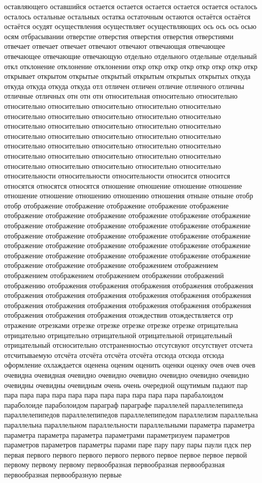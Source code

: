 оставляющего оставшийся остается остается остается остается остается осталось осталось остальные остальных остатка остаточным остаются остаётся остаётся остаётся осудят осуществления осуществляет осуществляющих ось ось ось осью осям отбрасывании отверстие отверстия отверстия отверстия отверстиями отвечает отвечает отвечает отвечают отвечают отвечающая отвечающее отвечающее отвечающие отвечающую отдельно отдельного отдельные отдельный откл отклонение отклонение отклонении откр откр откр откр откр откр откр откр открывает открытом открытые открытый открытым открытых открытых откуда откуда откуда откуда откуда отл отличен отличен отличие отличного отличны отличные отличных отн отн отн относительная относительно относительно относительно относительно относительно относительно относительно относительно относительно относительно относительно относительно относительно относительно относительно относительно относительно относительно относительно относительно относительно относительно относительно относительно относительно относительно относительно относительно относительно относительно относительно относительно относительно относительно относительно относительно относительно относительности относительности относительности относится относится относятся относятся относятся отношение отношение отношение отношение отношение отношение отношению отношению отношения отныне отныне отобр отобр отображение отображение отображение отображение отображение отображение отображение отображение отображение отображение отображение отображение отображение отображение отображение отображение отображение отображение отображение отображение отображение отображение отображение отображение отображение отображение отображение отображение отображение отображение отображение отображение отображение отображение отображение отображение отображение отображение отображением отображением отображением отображением отображением отображении отображений отображению отображения отображения отображения отображения отображения отображения отображения отображения отображения отображения отображения отображения отображения отображения отображения отображения отображения отображения отображения отображения отождествив отождествляется отр отражение отрезками отрезке отрезке отрезке отрезке отрезке отрицательна отрицательно отрицательно отрицательной отрицательной отрицательный отрицательный отсносительно отстраненностью отсутсвуют отсутствует отсчета отсчитываемую отсчёта отсчёта отсчёта отсчёта отсюда отсюда отсюда оформление охлаждается оценена оценим оценить оценки оценку очев очев очев очевидна очевидная очевидно очевидно очевидно очевидно очевидно очевидно очевидны очевидны очевидным очень очень очередной ощутимым падают пар пара пара пара пара пара пара пара пара пара пара пара парабалоидом параболоиде параболоидом параграф параграфе параллелей параллелепипеда параллелепипедов параллелепипедов параллелепипедом параллелизм параллельна параллельна параллельном параллельности параллельными параметра параметра параметра параметра параметра параметрами параметризуем параметров параметров параметров параметры парами паре пару пару пары паули пдск пер первая первого первого первого первого первого первое первое первое первой первому первому первому первообразная первообразная первообразная первообразная первообразную первые 